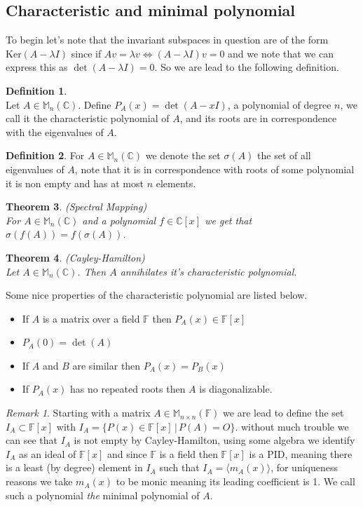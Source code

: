 \documentclass[12pt]{article}
\newcommand{\double}{\hspace{2pt}}
\newtheorem{theorem}{Theorem}[section]
\theoremstyle{definition}
\newtheorem{definition}[theorem]{Definition}
\theoremstyle{remark}
\newtheorem*{remark}{Remark}
\theoremstyle{plain}
\begin{document}
\subsection{Characteristic and minimal polynomial}
To begin let's note that the invariant subspaces in question are of the form $ \mathrm{Ker}(A-\lambda I)$ since if $Av=\lambda v \iff (A-\lambda I)v=0 $ and we note that we can express this as $ \det(A-\lambda I)=0 $. So we are lead to the following definition.
\begin{definition}\leavevmode \\
Let $A\in \mathbb{M}_n(\mathbb{C})$. Define $P_A(x)=\det(A-xI)$, a polynomial of degree $n$, we call it the characteristic polynomial of $A$, and its roots are in correspondence with the eigenvalues of $A$.
\end{definition}
\begin{definition}
    For $A\in \mathbb{M}_n(\mathbb{C})$ we denote the set $\sigma(A)$ the set of all eigenvalues of $A$, note that it is in correspondence with roots of some polynomial it is non empty and has at most $n$ elements.
\end{definition}
\begin{theorem}\textup{(Spectral Mapping)}\\
For $A\in \mathbb{M}_n(\mathbb{C})$ and a polynomial $f\in \mathbb{C}[x]$ we get that $\sigma(f(A))=f(\sigma(A))$.
    
\end{theorem}
\begin{theorem}\textup{(Cayley-Hamilton)}\\
Let $A\in \mathbb{M}_n(\mathbb{C})$. Then $A$ annihilates it's characteristic polynomial.
\end{theorem}
Some nice properties of the characteristic polynomial are listed below.
\begin{itemize}
	\item If $A$ is a matrix over a field $\mathbb{F} $ then $ P_A(x)\in \mathbb{F}[x] $
	\item $ P_A(0)=\det(A) $
	\item If $A$ and $B$ are similar then $ P_A(x)=P_B(x) $
	\item If $P_A(x)$ has no repeated roots then $A$ is diagonalizable.
\end{itemize}
\begin{remark}

Starting with a matrix $ A \in \mathbb{M}_{n\times n}(\mathbb{F})$ we are lead to define the set $I_A \subset \mathbb{F}[x]$ with $ I_A=\{P(x)\in \mathbb{F}[x] \double|\double P(A)=O\} $.
without much trouble we can see that $I_A$ is not empty by Cayley-Hamilton, using some algebra we identify $I_A$ as an ideal of $ \mathbb{F}[x] $ and since $ \mathbb{F} $ is a field then $ \mathbb{F}[x]$ is a PID, meaning there is a least (by degree) element in $ I_A $ such that $I_A=\langle m_A(x)\rangle$, for uniqueness reasons we take $m_A(x)$ to be monic meaning its leading coefficient is 1. We call such a polynomial \textit{the} minimal polynomial of $A$.
\end{remark}
\end{document}

